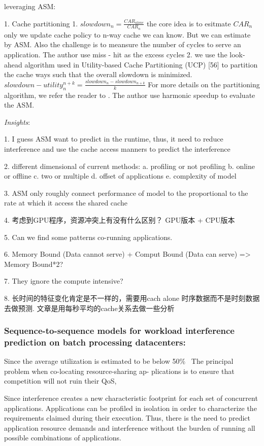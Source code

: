 \documentclass[UTF8]{article}
\begin{document}
leveraging ASM:

1. Cache partitioning 1. $slowdown_n = \frac{CAR_{alone}}{CAR_n}$  the core idea is to esitmate $CAR_n$ only we update cache policy to n-way cache we can know. But we can estimate by ASM. Also the challenge is to meansure the number of cycles to serve an application. The author use miss - hit as the excess cycles 2. we use the look-ahead algorithm used in Utility-based Cache Partitioning (UCP) [56] to partition the cache ways such that the overall slowdown is minimized. $slowdown-utility^{n+k}_n = \frac{slowdown_n - slowdown_{n+k}}{k}$  For more details on the partitioning algorithm, we refer the reader to \cite{qureshi2006utility}. The author use harmonic speedup to evaluate the ASM.


\emph{Insights}: 

1. I guess ASM want to predict in the runtime, thus, it need to reduce interference and use the cache access manners to predict the interference 

2. different dimensional of current methods: a. profiling or not profiling b. online or offline c. two or multiple d. offset of applications e. complexity of model 

3. ASM only roughly connect performance of model to the proportional to the rate at which it access the shared cache 

4. 考虑到GPU程序，资源冲突上有没有什么区别？ GPU版本 + CPU版本 

5. Can we find some patterns co-running applications. 

6. Memory Bound (Data cannot serve) + Comput Bound (Data can serve) => Memory Bound*2? 

7. They ignore the compute intensive?

8. 长时间的特征变化肯定是不一样的，需要用cach alone 时序数据而不是时刻数据去做预测. 文章是用每秒平均的cache关系去做一些分析

\subsubsection{Sequence-to-sequence models for workload interference prediction on batch processing datacenters:}

Since the average utilization is estimated to be below 50\%~\cite{barroso2007case, reiss2012heterogeneity} The principal problem when co-locating resource-sharing ap- plications is to ensure that competition will not ruin their QoS,

Since interference creates a new characteristic footprint for each set of concurrent applications. Applications can be profiled in isolation in order to characterize the requirements claimed during their execution. Thus, there is the need to predict application resource demands and interference without the burden of running all possible combinations of applications.
\end{document}
